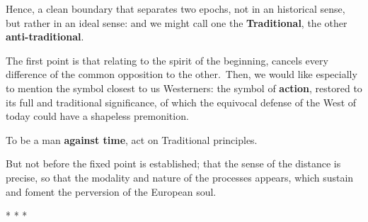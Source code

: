 Hence, a clean boundary that separates two epochs, not in an historical sense, but rather in an ideal sense: and we might call one the \textbf{Traditional}, the other \textbf{anti-traditional}. 

The first point is that relating to the spirit of the beginning, cancels every difference of the common opposition to the other. Then, we would like especially to mention the symbol closest to us Westerners: the symbol of \textbf{action}, restored to its full and traditional significance, of which the equivocal defense of the West of today could have a shapeless premonition. 

\begin{quotex}
To be a man \textbf{against time}, act on Traditional principles.

\end{quotex}
But not before the fixed point is established; that the sense of the distance is precise, so that the modality and nature of the processes appears, which sustain and foment the perversion of the European soul.




\begin{center}* * *\end{center}

